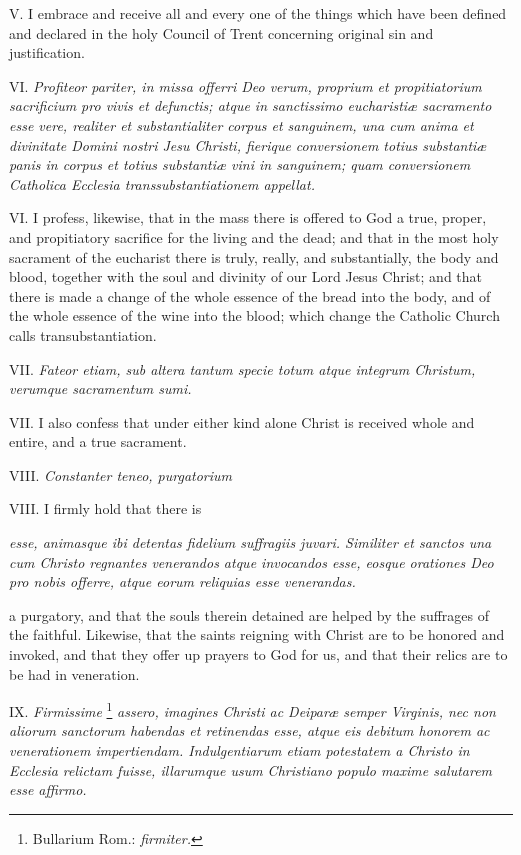 V. I embrace and receive all and every one of the things which have been defined and declared in the holy Council of Trent concerning original sin and justification.

VI. \emph{Profiteor pariter, in missa offerri Deo verum, proprium et propitiatorium sacrificium pro vivis et defunctis; atque in sanctissimo eucharistiæ sacramento esse vere, realiter et substantialiter corpus et sanguinem, una cum anima et divinitate Domini nostri Jesu Christi, fierique conversionem totius substantiæ panis in corpus et totius substantiæ vini in sanguinem; quam conversionem Catholica Ecclesia transsubstantiationem appellat.}

VI. I profess, likewise, that in the mass there is offered to God a true, proper, and propitiatory sacrifice for the living and the dead; and that in the most holy sacrament of the eucharist there is truly, really, and substantially, the body and blood, together with the soul and divinity of our Lord Jesus Christ; and that there is made a change of the whole essence of the bread into the body, and of the whole essence of the wine into the blood; which change the Catholic Church calls transubstantiation.

VII. \emph{Fateor etiam, sub altera tantum specie totum atque integrum Christum, verumque sacramentum sumi.}

VII. I also confess that under either kind alone Christ is received whole and entire, and a true sacrament.

VIII. \emph{Constanter teneo, purgatorium }

VIII. I firmly hold that there is

\emph{esse, animasque ibi detentas fidelium suffragiis juvari. Similiter et sanctos una cum Christo regnantes venerandos atque invocandos esse, eosque orationes Deo pro nobis offerre, atque eorum reliquias esse venerandas.}

a purgatory, and that the souls therein detained are helped by the suffrages of the faithful. Likewise, that the saints reigning with Christ are to be honored and invoked, and that they offer up prayers to God for us, and that their relics are to be had in veneration.

IX. \emph{Firmissime} \footnote{\par Bullarium Rom.: \emph{firmiter.}}  \emph{assero, imagines Christi ac Deiparæ semper Virginis, nec non aliorum sanctorum habendas et retinendas esse, atque eis debitum honorem ac venerationem impertiendam. Indulgentiarum etiam potestatem a Christo in Ecclesia relictam fuisse, illarumque usum Christiano populo maxime salutarem esse affirmo.}

